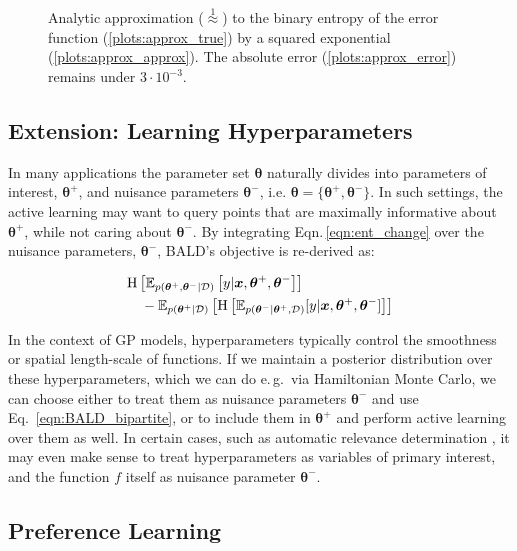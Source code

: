 \documentclass[twoside]{article}
\newcommand{\x}{\bm{x}}
\newcommand{\y}{y}
\newcommand{\data}{\mathcal{D}}
\newcommand{\param}{\bm{\theta}}
\newcommand{\E}{\mathbb{E}}
\newcommand{\rmH}{\mathrm{H}}
\begin{document}
\begin{figure}\centering

\caption{Analytic approximation ({\scriptsize $\stackrel{1}{\approx}$}) to the binary entropy of the error function (\ref{plots:approx_true}) by a squared exponential (\ref{plots:approx_approx}). The absolute error (\ref{plots:approx_error}) remains under $3\cdot 10^{-3}$. }\label{fig:trick}
\end{figure}

\subsection{Extension: Learning Hyperparameters \label{sec:hyperparameters}}

In many applications the parameter set $\param$ naturally divides into parameters of interest, $\param^+$, and nuisance parameters $\param^-$, i.e. $\param=\{\param^+,\param^-\}$. In such settings, the active learning may want to query points that are maximally informative about $\param^+$, while not caring about $\param^-$. By integrating Eqn.\,\eqref{eqn:ent_change} over the nuisance parameters, $\param^-$, BALD's objective is re-derived as:

\begin{align} 
&\rmH\left[\E_{p(\param^+,\param^-\vert \data)}\left[\y|\x,\param^+,\param^-\right]\right] \notag\\
&\quad- \E_{p(\param^+|\data)} \left[ \rmH\left[\E_{p(\param^-|\param^+,\data)}[ \y \vert \x, \param^+,\param^- ]\right] \right]\label{eqn:BALD_bipartite}
\end{align}

In the context of GP models, hyperparameters typically control the smoothness or spatial length-scale of functions. If we maintain a posterior distribution over these hyperparameters, which we can do e.\,g.\ via Hamiltonian Monte Carlo, we can choose either to treat them as nuisance parameters $\param^-$ and use Eq.\ \ref{eqn:BALD_bipartite}, or to include them in $\param^+$ and perform active learning over them as well. In certain cases, such as automatic relevance determination \cite{rasmussen2005}, it may even make sense to treat hyperparameters as variables of primary interest, and the function $f$ itself as nuisance parameter $\param^-$.

\subsection{Preference Learning}
\end{document}
